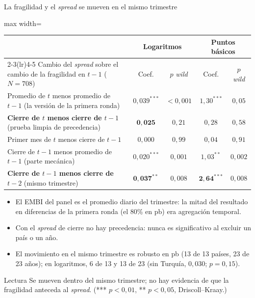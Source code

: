 \documentclass[aspectratio=169]{beamer}
\begin{document}
\begin{frame}{La fragilidad y el \textit{spread} se mueven en el mismo trimestre}
\centering
\footnotesize
\begin{adjustbox}{max width=\textwidth}
\begin{tabular}{l cc cc}
\toprule
 & \multicolumn{2}{c}{Logaritmos} & \multicolumn{2}{c}{Puntos básicos} \\
\cmidrule(lr){2-3}\cmidrule(lr){4-5}
Cambio del \textit{spread} sobre el cambio de la fragilidad en $t-1$ ($N=708$) & Coef. & $p$ \textit{wild} & Coef. & $p$ \textit{wild} \\
\midrule
Promedio de $t$ menos promedio de $t-1$ (la versión de la primera ronda) & $0{,}039^{***}$ & $<0{,}001$ & $1{,}30^{***}$ & $0{,}05$ \\
\textbf{Cierre de $t$ menos cierre de $t-1$} (prueba limpia de precedencia) & $\mathbf{0{,}025}$ & $0{,}21$ & $0{,}28$ & $0{,}58$ \\
Primer mes de $t$ menos cierre de $t-1$ & $0{,}000$ & $0{,}99$ & $0{,}04$ & $0{,}91$ \\
Cierre de $t-1$ menos promedio de $t-1$ (parte mecánica) & $0{,}020^{***}$ & $0{,}001$ & $1{,}03^{**}$ & $0{,}002$ \\
\textbf{Cierre de $t-1$ menos cierre de $t-2$} (mismo trimestre) & $\mathbf{0{,}037^{**}}$ & $0{,}008$ & $\mathbf{2{,}64^{***}}$ & $0{,}008$ \\
\bottomrule
\end{tabular}
\end{adjustbox}
\vspace{1pt}
\begin{itemize}\footnotesize\setlength\itemsep{0pt}
\item El EMBI del panel es el promedio diario del trimestre: la mitad del resultado en diferencias de la primera ronda (el 80\% en pb) era agregación temporal.
\item Con el \textit{spread} de cierre no hay precedencia: nunca es significativo al excluir un país o un año.
\item El movimiento en el mismo trimestre es robusto en pb (13 de 13 países, 23 de 23 años); en logaritmos, 6 de 13 y 13 de 23 (sin Turquía, $0{,}030$; $p=0{,}15$).
\end{itemize}
\vspace{-8pt}
\begin{alertblock}{Lectura}
\footnotesize Se mueven dentro del mismo trimestre; no hay evidencia de que la fragilidad anteceda al \textit{spread}. {\scriptsize (*** $p<0{,}01$, ** $p<0{,}05$, Driscoll--Kraay.)}
\end{alertblock}
\end{frame}
\end{document}
